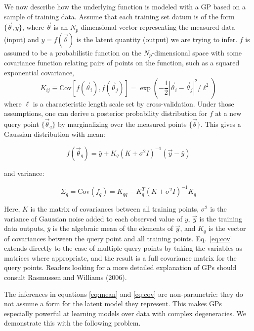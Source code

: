 \documentclass[useAMS,usenatbib,tightenlines,11pt,preprint]{aastex}
\begin{document}
We now describe how the underlying function is modeled with a GP based on a
sample of training data.  Assume that each training set datum is of the
form $\{\vec{\theta},y\}$, where $\vec{\theta}$ is an $N_p$-dimensional
vector representing the measured data (input) and $y = f(\vec{\theta})$ is the
latent quantity (output) we are trying to infer.  $f$ is assumed to be a
probabilistic function on the $N_p$-dimensional space with some covariance
function relating pairs of points on the function, such as a squared
exponential covariance,
\begin{equation}
\label{eq:covariogram}
K_{ij}\equiv\text{Cov}\left[f(\vec{\theta}_{i}),f(\vec{\theta}_{j})\right]
= \exp(-\frac{1}{2}|\vec{\theta}_{i} - \vec{\theta}_{j}|^2/\ell^2)
\end{equation}
where $\ell$
is a characteristic length scale set by cross-validation.  
Under those
assumptions, one can derive a posterior probability distribution for $f$
at a new query point $\{\vec{\theta}_{q}\}$ by marginalizing over
the measured points $\{\vec{\theta}\}$.  This gives a Gaussian distribution
with mean:

\begin{equation}
f(\vec{\theta}_q)=\bar{y}+K_q\left(K+\sigma^2 I\right)^{-1}(\vec{y}-\bar{y})
\label{eq:mean}
\end{equation}

\noindent
and variance:

\begin{equation}
\Sigma_{q} = \text{Cov}(f_{q}) = K_{qq} - K_q^T (K + \sigma^2I)^{-1} K_q
\label{eq:cov}
\end{equation}

\noindent
Here, $K$ is the matrix of
covariances between all training points, $\sigma^2$ is the variance of
Gaussian noise added to each observed value of $y$, $\vec{y}$
is the training data outputs, $\bar{y}$ is the algebraic mean of the elements of
$\vec{y}$, and
$K_q$ is the vector of covariances between the query point and all
training points.  Eq.~\ref{eq:cov} extends directly to the case of multiple
query points by taking the variables as matrices where appropriate, and the
result is a full covariance matrix for the query points.  Readers looking
for a more detailed explanation of GPs should consult
Rasmussen and Williams (2006).


The inferences in equations \ref{eq:mean} and \ref{eq:cov} are non-parametric:
they do not assume a form for the latent model they represent.  This makes GPs
especially powerful at learning models over data
with complex degeneracies.  We demonstrate this with the following problem.
\end{document}
